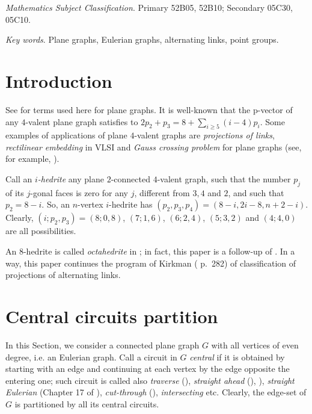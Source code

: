 \documentclass[12pt]{article}
\begin{document}
{\em Mathematics Subject Classification}. Primary 52B05, 52B10;
Secondary 05C30, 05C10.

{\em Key words}. Plane graphs, Eulerian graphs, alternating links, point groups.

\section{Introduction}

See \cite{Gr} for terms used here for plane graphs.
It is well-known that the p-vector of any $4$-valent plane graph satisfies to
$2p_2+p_3=8+ \sum_{i\geq 5} (i-4)p_i$.
Some examples of applications of plane $4$-valent graphs are {\em projections
of links}, {\em rectilinear embedding} in VLSI and {\em Gauss crossing 
problem} for plane graphs (see, for example, \cite{Liu}).

\vspace{2mm}


Call an {\em $i$-hedrite} any plane $2$-connected
$4$-valent graph, such that the number
$p_j$ of its $j$-gonal faces is zero for any $j$, different from 
$3,4$ and $2$, and such that $p_2=8-i$. So, 
an $n$-vertex $i$-hedrite has $(p_2, p_3, p_4)=(8-i, 2i-8, n+2-i)$.
Clearly, $(i;p_2,p_3)=(8;0,8)$, $(7;1,6)$, $(6;2,4)$,
$(5;3,2)$ and $(4;4,0)$ are all possibilities. 

An $8$-hedrite is called {\em octahedrite} in \cite{DSt}; in fact, this paper is a follow-up of \cite{DSt}.
In a way, this paper continues the program of Kirkman (\cite{Kirk} p.~282) of classification of projections of alternating links.


















\section{Central circuits partition}

In this Section, we consider a connected plane graph $G$ with all vertices of 
even degree, i.e. an Eulerian graph. 
Call a circuit in $G$ {\it central} if it is obtained by starting with an
edge and continuing at each vertex by the edge opposite the entering one; such 
circuit is called also {\em traverse} 
(\cite{GK}), {\em straight ahead} (\cite{Ha}),  \cite{PTZ}), 
{\em straight Eulerian} (Chapter 17 of \cite{God}), 
{\em cut-through} (\cite{Je}),
{\em intersecting} etc. Clearly, the edge-set of 
$G$ is partitioned by all its central circuits.
\end{document}
